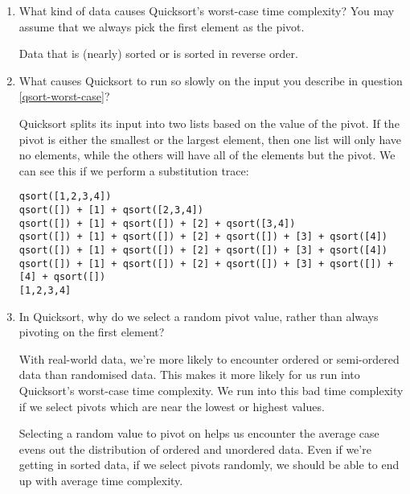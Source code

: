 \documentclass[11pt]{article}
\newenvironment{answer}{\large\lstset{basicstyle=\large}\color{white}}{}
\newenvironment{answer}{\large\lstset{basicstyle=\large}\color{red}}{}
\begin{document}
\begin{enumerate}
\item\label{qsort-worst-case} What kind of data causes Quicksort's worst-case
      time complexity? You may assume that we always pick the first element as
      the pivot.

      \begin{answer}
      Data that is (nearly) sorted or is sorted in reverse order.
      \end{answer}

\item What causes Quicksort to run so slowly on the input you describe in
      question \ref{qsort-worst-case}?

    \begin{answer}
    Quicksort splits its input into two lists based on the value of the pivot.
    If the pivot is either the smallest or the largest element, then one list
    will only have no elements, while the others will have all of the elements
    but the pivot. We can see this if we perform a substitution trace:

\begin{verbatim}
qsort([1,2,3,4])
qsort([]) + [1] + qsort([2,3,4])
qsort([]) + [1] + qsort([]) + [2] + qsort([3,4])
qsort([]) + [1] + qsort([]) + [2] + qsort([]) + [3] + qsort([4])
qsort([]) + [1] + qsort([]) + [2] + qsort([]) + [3] + qsort([4])
qsort([]) + [1] + qsort([]) + [2] + qsort([]) + [3] + qsort([]) + [4] + qsort([])
[1,2,3,4]
\end{verbatim}
    \end{answer}

\item In Quicksort, why do we select a random pivot value, rather than always
      pivoting on the first element?

      \begin{answer}
      With real-world data, we're more likely to encounter ordered or
      semi-ordered data than randomised data. This makes it more likely for us
      run into Quicksort's worst-case time complexity. We run into this bad
      time complexity if we select pivots which are near the lowest or highest
      values.

      Selecting a random value to pivot on helps us encounter the average case
      evens out the distribution of ordered and unordered data. Even if we're
      getting in sorted data, if we select pivots randomly, we should be able
      to end up with average time complexity.
      \end{answer}


\end{enumerate}
\end{document}
